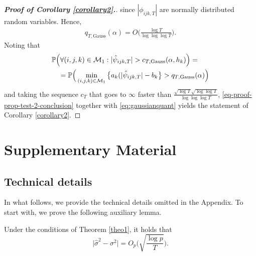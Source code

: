 \documentclass[a4paper,12pt]{article}
\numberwithin{equation}{section}
\begin{document}
\begin{proof}[\textnormal{\textbf{Proof of Corollary \ref{corollary2}.}}]
since $|\phi_{ijk, T}|$ are normally distributed random variables. Hence,
\begin{align}\label{eq:gaussianquant}
q_{T, \text{Gauss}} (\alpha) = O \bigg(\frac{\log T}{\log \log \log T}\bigg).
\end{align}
Noting that 
\begin{align*}
&\mathbb{P}\Big( \forall (i,j,k) \in \mathcal{M}_1: |\hat{\psi}_{ijk,T}| > c_{T,\textnormal{Gauss}}(\alpha,h_k) \Big) = \\
& \quad = \mathbb{P}\Big( \min_{(i,j,k) \in \mathcal{M}_1} \big\{a_k (|\hat{\psi}_{ijk,T}| - b_k \big\} > q_{T,\textnormal{Gauss}}(\alpha) \Big)
\end{align*}
and taking the sequence $c_T$ that goes to $\infty$ faster than $\frac{\sqrt{\log T}\sqrt{\log \log T}}{\log \log \log T}$, \eqref{eq-proof-prop-test-2-conclusion} together with \eqref{eq:gaussianquant} yields the statement of Corollary \ref{corollary2}.
\end{proof}



{\small
\setlength{\bibsep}{0.35em}
}



\newpage
\def\thesection{\Alph{section}}
\setcounter{section}{18}
\section{Supplementary Material}


\def\theequation{S.\arabic{equation}}
\setcounter{equation}{0}
\def\thefigure{S.\arabic{figure}}
\setcounter{figure}{0}
\def\thetable{S.\arabic{table}}
\setcounter{table}{0}
\renewcommand{\baselinestretch}{1.2}\normalsize



\subsection{Technical details}


In what follows, we provide the technical details omitted in the Appendix. To start with, we prove the following auxiliary lemma.
\begin{lemmaS}\label{lemmaS1}
Under the conditions of Theorem \ref{theo1}, it holds that 
\[ \big| \hat{\sigma}^2 - \sigma^2 \big| = O_p\Big( \sqrt{\frac{\log p}{T}} \Big). \]
\end{lemmaS} 
\end{document}
